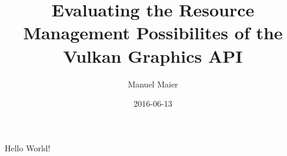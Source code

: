 \documentclass{article}
\title{Evaluating the Resource Management Possibilites of the Vulkan Graphics API}
\date{2016-06-13}
\author{Manuel Maier}
\begin{document}
  \maketitle
  \newpage

  Hello World!  
\end{document}
